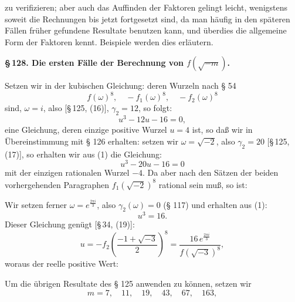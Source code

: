 zu verifizieren; aber auch das Auffinden der Faktoren gelingt
leicht, wenigstens soweit die Rechnungen bis jetzt fortgesetzt sind,
da man häufig in den späteren Fällen früher gefundene Resultate benutzen kann, und überdies die allgemeine Form der Faktoren kennt. Beispiele werden dies erläutern.

\textbf{§\,128. Die ersten Fälle der Berechnung von $f(\sqrt{-m})$.}

Setzen wir in der kubischen Gleichung:
deren Wurzeln nach § 54
\[
f(\omega)^8, \quad -f_1(\omega)^8, \quad -f_2(\omega)^8
\]
sind, $\omega = i$, also [§\,125, (16)], $\gamma_2 = 12$, so folgt:
\[
u^3 - 12u - 16 = 0,
\]
eine Gleichung, deren einzige positive Wurzel $u = 4$ ist, so daß
wir in Übereinstimmung mit § 126 erhalten:
setzen wir $\omega = \sqrt{-2}$, also $\gamma_2 = 20$ [§\,125, (17)], so erhalten
wir aus (1) die Gleichung:
\[
u^3 - 20u - 16 = 0
\]
mit der einzigen rationalen Wurzel $-4$. Da aber nach den
Sätzen der beiden vorhergehenden Paragraphen $f_1(\sqrt{-2})^8$ rational
sein muß, so ist:

Wir setzen ferner $\omega = e^{\frac{2\pi i}{3}}$, also $\gamma_2(\omega) = 0$ (§ 117) und
erhalten aus (1):
\[
u^3 = 16.
\]
Dieser Gleichung genügt [§\,34, (19)]:
\[
u = -f_2\left(\frac{-1+\sqrt{-3}}{2}\right)^8 = \frac{16\,e^{\frac{2\pi i}{3}}}{f(\sqrt{-3})^8},
\]
woraus der reelle positive Wert:

Um die übrigen Resultate des § 125 anwenden zu können,
setzen wir
\[
m = 7, \quad 11, \quad 19, \quad 43, \quad 67, \quad 163,
\]
